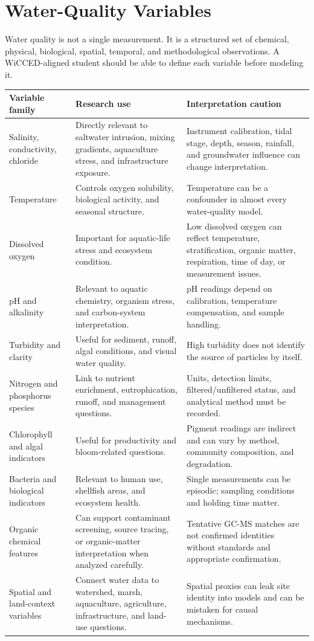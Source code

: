 \section{Water-Quality Variables}

Water quality is not a single measurement. It is a structured set of chemical, physical, biological, spatial, temporal, and methodological observations. A WiCCED-aligned student should be able to define each variable before modeling it.

\begin{longtable}{p{}p{}p{}}
\toprule
\textbf{Variable family} & \textbf{Research use} & \textbf{Interpretation caution} \\
\midrule
Salinity, conductivity, chloride & Directly relevant to saltwater intrusion, mixing gradients, aquaculture stress, and infrastructure exposure. & Instrument calibration, tidal stage, depth, season, rainfall, and groundwater influence can change interpretation. \\
Temperature & Controls oxygen solubility, biological activity, and seasonal structure. & Temperature can be a confounder in almost every water-quality model. \\
Dissolved oxygen & Important for aquatic-life stress and ecosystem condition. & Low dissolved oxygen can reflect temperature, stratification, organic matter, respiration, time of day, or measurement issues. \\
pH and alkalinity & Relevant to aquatic chemistry, organism stress, and carbon-system interpretation. & pH readings depend on calibration, temperature compensation, and sample handling. \\
Turbidity and clarity & Useful for sediment, runoff, algal conditions, and visual water quality. & High turbidity does not identify the source of particles by itself. \\
Nitrogen and phosphorus species & Link to nutrient enrichment, eutrophication, runoff, and management questions. & Units, detection limits, filtered/unfiltered status, and analytical method must be recorded. \\
Chlorophyll and algal indicators & Useful for productivity and bloom-related questions. & Pigment readings are indirect and can vary by method, community composition, and degradation. \\
Bacteria and biological indicators & Relevant to human use, shellfish areas, and ecosystem health. & Single measurements can be episodic; sampling conditions and holding time matter. \\
Organic chemical features & Can support contaminant screening, source tracing, or organic-matter interpretation when analyzed carefully. & Tentative GC-MS matches are not confirmed identities without standards and appropriate confirmation. \\
Spatial and land-context variables & Connect water data to watershed, marsh, aquaculture, agriculture, infrastructure, and land-use questions. & Spatial proxies can leak site identity into models and can be mistaken for causal mechanisms. \\
\bottomrule
\end{longtable}

